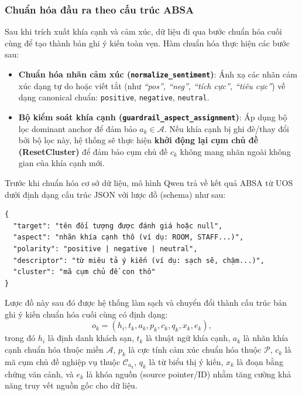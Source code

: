 \subsubsection{Chuẩn hóa đầu ra theo cấu trúc ABSA}
\label{subsubsec:method1-output-normalization}

Sau khi trích xuất khía cạnh và cảm xúc, dữ liệu đi qua bước chuẩn hóa cuối cùng để tạo thành bản ghi ý kiến toàn vẹn. Hàm chuẩn hóa thực hiện các bước sau:
\begin{itemize}[leftmargin=1.2cm]
    \item \textbf{Chuẩn hóa nhãn cảm xúc (\texttt{normalize\_sentiment})}: Ánh xạ các nhãn cảm xúc dạng tự do hoặc viết tắt (như \textit{``pos'', ``neg'', ``tích cực'', ``tiêu cực''}) về dạng canonical chuẩn: \texttt{positive}, \texttt{negative}, \texttt{neutral}.
    \item \textbf{Bộ kiểm soát khía cạnh (\texttt{guardrail\_aspect\_assignment})}: Áp dụng bộ lọc dominant anchor để đảm bảo $a_k \in \mathcal{A}$. Nếu khía cạnh bị ghi đè/thay đổi bởi bộ lọc này, hệ thống sẽ thực hiện \textbf{khởi động lại cụm chủ đề (ResetCluster)} để đảm bảo cụm chủ đề $c_k$ không mang nhãn ngoài không gian của khía cạnh mới.
\end{itemize}

Trước khi chuẩn hóa cơ sở dữ liệu, mô hình Qwen trả về kết quả ABSA từ UOS dưới định dạng cấu trúc JSON với lược đồ (schema) như sau:
\begin{verbatim}
{
  "target": "tên đối tượng được đánh giá hoặc null",
  "aspect": "nhãn khía cạnh thô (ví dụ: ROOM, STAFF...)",
  "polarity": "positive | negative | neutral",
  "descriptor": "từ miêu tả ý kiến (ví dụ: sạch sẽ, chậm...)",
  "cluster": "mã cụm chủ đề con thô"
}
\end{verbatim}

Lược đồ này sau đó được hệ thống làm sạch và chuyển đổi thành cấu trúc bản ghi ý kiến chuẩn hóa cuối cùng có định dạng:
\begin{equation}
o_k = (h_i, t_k, a_k, p_k, c_k, q_k, x_k, e_k),
\label{eq:method1-core-record}
\end{equation}
trong đó $h_i$ là định danh khách sạn, $t_k$ là thuật ngữ khía cạnh, $a_k$ là nhãn khía cạnh chuẩn hóa thuộc miền $\mathcal{A}$, $p_k$ là cực tính cảm xúc chuẩn hóa thuộc $\mathcal{P}$, $c_k$ là mã cụm chủ đề nghiệp vụ thuộc $\mathcal{C}_{a_k}$, $q_k$ là từ biểu thị ý kiến, $x_k$ là đoạn bằng chứng văn cảnh, và $e_k$ là khóa nguồn (source pointer/ID) nhằm tăng cường khả năng truy vết nguồn gốc cho dữ liệu.

